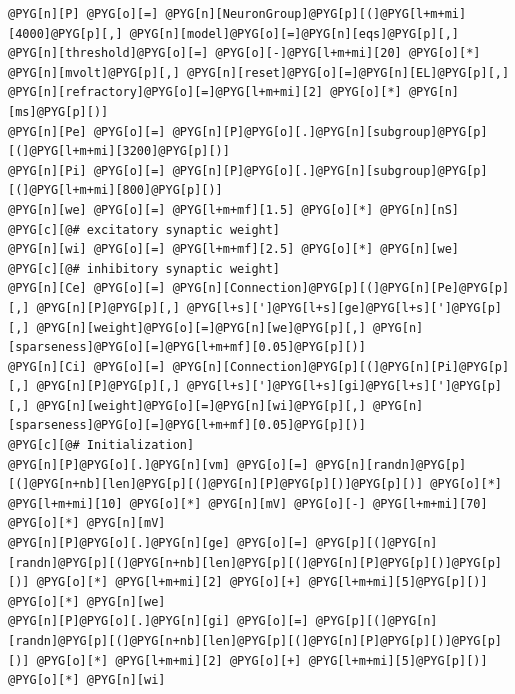 \documentclass[letterpaper,10pt,english]{manual}
\begin{document}
\begin{Verbatim}[commandchars=@\[\]]
@PYG[n][P] @PYG[o][=] @PYG[n][NeuronGroup]@PYG[p][(]@PYG[l+m+mi][4000]@PYG[p][,] @PYG[n][model]@PYG[o][=]@PYG[n][eqs]@PYG[p][,] @PYG[n][threshold]@PYG[o][=] @PYG[o][-]@PYG[l+m+mi][20] @PYG[o][*] @PYG[n][mvolt]@PYG[p][,] @PYG[n][reset]@PYG[o][=]@PYG[n][EL]@PYG[p][,] @PYG[n][refractory]@PYG[o][=]@PYG[l+m+mi][2] @PYG[o][*] @PYG[n][ms]@PYG[p][)]
@PYG[n][Pe] @PYG[o][=] @PYG[n][P]@PYG[o][.]@PYG[n][subgroup]@PYG[p][(]@PYG[l+m+mi][3200]@PYG[p][)]
@PYG[n][Pi] @PYG[o][=] @PYG[n][P]@PYG[o][.]@PYG[n][subgroup]@PYG[p][(]@PYG[l+m+mi][800]@PYG[p][)]
@PYG[n][we] @PYG[o][=] @PYG[l+m+mf][1.5] @PYG[o][*] @PYG[n][nS] @PYG[c][@# excitatory synaptic weight]
@PYG[n][wi] @PYG[o][=] @PYG[l+m+mf][2.5] @PYG[o][*] @PYG[n][we] @PYG[c][@# inhibitory synaptic weight]
@PYG[n][Ce] @PYG[o][=] @PYG[n][Connection]@PYG[p][(]@PYG[n][Pe]@PYG[p][,] @PYG[n][P]@PYG[p][,] @PYG[l+s][']@PYG[l+s][ge]@PYG[l+s][']@PYG[p][,] @PYG[n][weight]@PYG[o][=]@PYG[n][we]@PYG[p][,] @PYG[n][sparseness]@PYG[o][=]@PYG[l+m+mf][0.05]@PYG[p][)]
@PYG[n][Ci] @PYG[o][=] @PYG[n][Connection]@PYG[p][(]@PYG[n][Pi]@PYG[p][,] @PYG[n][P]@PYG[p][,] @PYG[l+s][']@PYG[l+s][gi]@PYG[l+s][']@PYG[p][,] @PYG[n][weight]@PYG[o][=]@PYG[n][wi]@PYG[p][,] @PYG[n][sparseness]@PYG[o][=]@PYG[l+m+mf][0.05]@PYG[p][)]
@PYG[c][@# Initialization]
@PYG[n][P]@PYG[o][.]@PYG[n][vm] @PYG[o][=] @PYG[n][randn]@PYG[p][(]@PYG[n+nb][len]@PYG[p][(]@PYG[n][P]@PYG[p][)]@PYG[p][)] @PYG[o][*] @PYG[l+m+mi][10] @PYG[o][*] @PYG[n][mV] @PYG[o][-] @PYG[l+m+mi][70] @PYG[o][*] @PYG[n][mV]
@PYG[n][P]@PYG[o][.]@PYG[n][ge] @PYG[o][=] @PYG[p][(]@PYG[n][randn]@PYG[p][(]@PYG[n+nb][len]@PYG[p][(]@PYG[n][P]@PYG[p][)]@PYG[p][)] @PYG[o][*] @PYG[l+m+mi][2] @PYG[o][+] @PYG[l+m+mi][5]@PYG[p][)] @PYG[o][*] @PYG[n][we]
@PYG[n][P]@PYG[o][.]@PYG[n][gi] @PYG[o][=] @PYG[p][(]@PYG[n][randn]@PYG[p][(]@PYG[n+nb][len]@PYG[p][(]@PYG[n][P]@PYG[p][)]@PYG[p][)] @PYG[o][*] @PYG[l+m+mi][2] @PYG[o][+] @PYG[l+m+mi][5]@PYG[p][)] @PYG[o][*] @PYG[n][wi]


\end{Verbatim}
\end{document}
